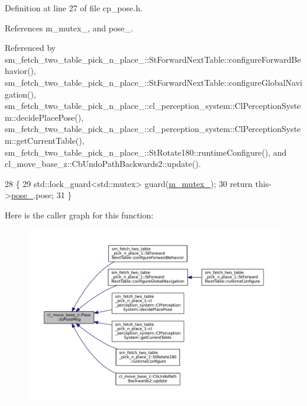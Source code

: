 Definition at line 27 of file cp\+\_\+pose.\+h.



References m\+\_\+mutex\+\_\+, and pose\+\_\+.



Referenced by sm\+\_\+fetch\+\_\+two\+\_\+table\+\_\+pick\+\_\+n\+\_\+place\+\_\+::\+St\+Forward\+Next\+Table\+::configure\+Forward\+Behavior(), sm\+\_\+fetch\+\_\+two\+\_\+table\+\_\+pick\+\_\+n\+\_\+place\+\_\+::\+St\+Forward\+Next\+Table\+::configure\+Global\+Navigation(), sm\+\_\+fetch\+\_\+two\+\_\+table\+\_\+pick\+\_\+n\+\_\+place\+\_\+::cl\+\_\+perception\+\_\+system\+::\+Cl\+Perception\+System\+::decide\+Place\+Pose(), sm\+\_\+fetch\+\_\+two\+\_\+table\+\_\+pick\+\_\+n\+\_\+place\+\_\+::cl\+\_\+perception\+\_\+system\+::\+Cl\+Perception\+System\+::get\+Current\+Table(), sm\+\_\+fetch\+\_\+two\+\_\+table\+\_\+pick\+\_\+n\+\_\+place\+\_\+::\+St\+Rotate180\+::runtime\+Configure(), and cl\+\_\+move\+\_\+base\+\_\+z\+::\+Cb\+Undo\+Path\+Backwards2\+::update().


\begin{DoxyCode}
28     \{
29         std::lock\_guard<std::mutex> guard(\hyperlink{classcl__move__base__z_1_1Pose_a73ed2daba3e473e156cab751fb37b58f}{m\_mutex\_});
30         \textcolor{keywordflow}{return} this->\hyperlink{classcl__move__base__z_1_1Pose_a9da7acf880968a3c220b8436fd0bb6ef}{pose\_}.pose;
31     \}
\end{DoxyCode}
Here is the caller graph for this function\+:
\nopagebreak
\begin{figure}[H]
\begin{center}
\leavevmode
\includegraphics[width=350pt]{classcl__move__base__z_1_1Pose_a9faf8c6b437ff6b19c8bddd692908dca_icgraph}
\end{center}
\end{figure}
\mbox{\label{classcl__move__base__z_1_1Pose_a63887a88c1ac6e9a4a71b8d7d11aed6c}} 
